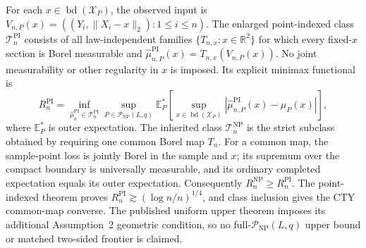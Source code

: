 For each \(x\in\operatorname{bd}(\mathcal X_P)\), the observed input is \(V_{n,P}(x)=((Y_i,\lVert X_i-x\rVert_2):1\leq i\leq n)\).  The enlarged point-indexed class \(\mathcal T_n^{\mathrm{PI}}\) consists of all law-independent families \(\{T_{n,x}:x\in\mathbb R^2\}\) for which every fixed-\(x\) section is Borel measurable and \(\widehat\mu_{n,P}^{\mathrm{PI}}(x)=T_{n,x}(V_{n,P}(x))\).  No joint measurability or other regularity in \(x\) is imposed.  Its explicit minimax functional is
\[
 R_n^{\mathrm{PI}}
 =\inf_{\widehat\mu_n^{\mathrm{PI}}\in\mathcal T_n^{\mathrm{PI}}}
 \sup_{P\in\mathcal P_{\mathrm{NP}}(L,q)}
 \mathbb E_P^*\!\left[
 \sup_{x\in\operatorname{bd}(\mathcal X_P)}
 \left|\widehat\mu_{n,P}^{\mathrm{PI}}(x)-\mu_P(x)\right|
 \right],
\]
where \(\mathbb E_P^*\) is outer expectation.  The inherited class \(\mathcal T_n^{\mathrm{NP}}\) is the strict subclass obtained by requiring one common Borel map \(T_n\).  For a common map, the sample-point loss is jointly Borel in the sample and \(x\); its supremum over the compact boundary is universally measurable, and its ordinary completed expectation equals its outer expectation.  Consequently \(R_n^{\mathrm{NP}}\geq R_n^{\mathrm{PI}}\).  The point-indexed theorem proves \(R_n^{\mathrm{PI}}\gtrsim(\log n/n)^{1/4}\), and class inclusion gives the CTY common-map converse.  The published uniform upper theorem imposes its additional Assumption~2 geometric condition, so no full-\(\mathcal P_{\mathrm{NP}}(L,q)\) upper bound or matched two-sided frontier is claimed.